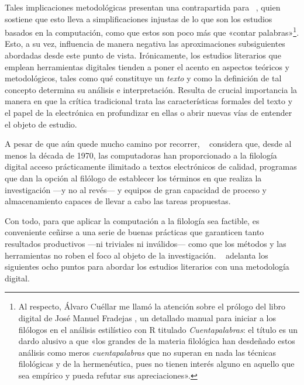 Tales implicaciones metodológicas presentan una contrapartida para \citeauthor{rommel2004}~\parencite*[90-91]{rommel2004}, quien sostiene que esto lleva a simplificaciones injustas de lo que son los estudios basados en la computación, como que estos son poco más que «contar palabras»\footnote{Al respecto, Álvaro Cuéllar me llamó la atención sobre el prólogo del libro digital de José Manuel Fradejas \parencite*{fradejas2022}, un detallado manual para iniciar a los filólogos en el análisis estilístico con R titulado \textit{Cuentapalabras}: el título es un dardo alusivo a que «los grandes de la materia filológica han desdeñado estos análisis como meros \textit{cuentapalabras} que no superan en nada las técnicas filológicas y de la hermenéutica, pues no tienen interés alguno en aquello que sea empírico y pueda refutar sus apreciaciones».}. Esto, a su vez, influencia de manera negativa las aproximaciones subsiguientes abordadas desde este punto de vista. Irónicamente, los estudios literarios que emplean herramientas digitales tienden a poner el acento en aspectos teóricos y metodológicos, tales como qué constituye un \textit{texto} y como la definición de tal concepto determina su análisis e interpretación. Resulta de crucial importancia la manera en que la crítica tradicional trata las características formales del texto y el papel de la electrónica en profundizar en ellas o abrir nuevas vías de entender el objeto de estudio.

A pesar de que aún quede mucho camino por recorrer, \citeauthor{rommel2004}~\parencite*[93]{rommel2004} considera que, desde al menos la década de 1970, las computadoras han proporcionado a la filología digital acceso prácticamente ilimitado a textos electrónicos de calidad, programas que dan la opción al filólogo de establecer los términos en que realiza la investigación —y no al revés— y equipos de gran capacidad de proceso y almacenamiento capaces de llevar a cabo las tareas propuestas.

Con todo, para que aplicar la computación a la filología sea factible, es conveniente ceñirse a una serie de buenas prácticas que garanticen tanto resultados productivos —ni triviales ni inválidos— como que los métodos y las herramientas no roben el foco al objeto de la investigación. \citeauthor{potter1991}~\parencite*[427-428]{potter1991} adelanta los siguientes ocho puntos para abordar los estudios literarios con una metodología digital.

